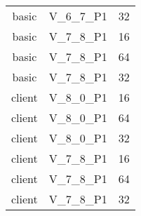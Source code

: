 \begin{longtable}{|c|c|c|}
            basic & V\_6\_7\_P1 & 32 \\
            basic & V\_7\_8\_P1 & 16 \\
            basic & V\_7\_8\_P1 & 64 \\
            basic & V\_7\_8\_P1 & 32 \\
            client & V\_8\_0\_P1 & 16 \\
            client & V\_8\_0\_P1 & 64 \\
            client & V\_8\_0\_P1 & 32 \\
            client & V\_7\_8\_P1 & 16 \\
            client & V\_7\_8\_P1 & 64 \\
            client & V\_7\_8\_P1 & 32 \\
        \end{longtable}

